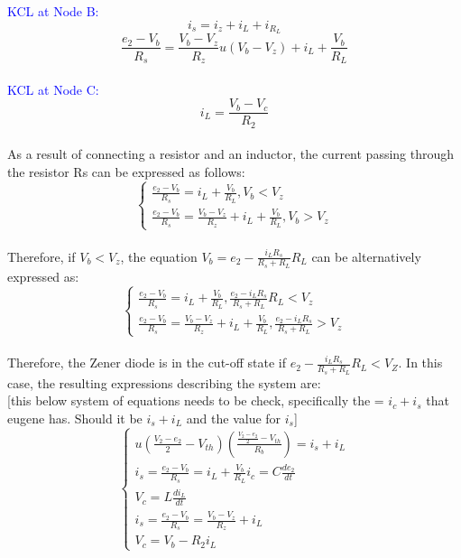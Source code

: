 \textcolor{blue}{KCL at Node B:}\\
\begin{equation}
    i_s=i_z+i_L+i_{R_L}
\end{equation}
\begin{equation}
    \frac{e_2-V_b}{R_s}=\frac{V_b-V_z}{R_z}u(V_b-V_z)+i_L+\frac{V_b}{R_L}
\end{equation}\\

\textcolor{blue}{KCL at Node C:}\\
\begin{equation}
    i_L=\frac{V_b-V_c}{R_2}
\end{equation}\\

As a result of connecting a resistor and an inductor, the current passing through the resistor Rs can be expressed as follows:\\

\begin{equation}
    \begin{cases}
        \frac{e_2-V_b}{R_s}=i_L+\frac{V_b}{R_L},  V_b<V_z\\
        \frac{e_2-V_b}{R_s}=\frac{V_b-V_z}{R_z}+i_L+\frac{V_b}{R_L},  V_b>V_z
    \end{cases}
\end{equation}\\

Therefore, if $V_b < V_z$, the equation $V_b = e_2 - \frac{i_L R_s}{R_s+R_L} R_L$ can be alternatively expressed as:\\

\begin{equation}
    \begin{cases}
        \frac{e_2-V_b}{R_s}=i_L+\frac{V_b}{R_L},  \frac{e_2-i_LR_s}{R_s+R_L}R_L<V_z\\
        \frac{e_2-V_b}{R_s}=\frac{V_b-V_z}{R_z}+i_L+\frac{V_b}{R_L},  \frac{e_2-i_LR_s}{R_s+R_L}>V_z
    \end{cases}
\end{equation}\\

Therefore, the Zener diode is in the cut-off state if $e_2 - \frac{i_L R_s}{R_s+R_L} R_L < V_Z$. In this case, the resulting expressions describing the system are:\\


[this below system of equations needs to be check, specifically the = $i_c+i_s$ that eugene has. Should it be $i_s+i_L$ and the value for $i_s $]
\begin{equation}
    \begin{cases}
        u(\frac{V_2-e_2}{2}-V_{th})(\frac{\frac{V_2-e_2}{2}-V_{th}}{R_b})=i_s+i_L\\
        i_s=\frac{e_2-V_b}{R_s}=i_L+\frac{V_b}{R_L}
        i_c=C\frac{de_2}{dt}\\
        V_c=L\frac{di_L}{dt}\\
        i_s=\frac{e_2-V_b}{R_s}=\frac{V_b-V_z}{R_z}+i_L\\
        V_c=V_b-R_2i_L
    \end{cases}
\end{equation}\\

